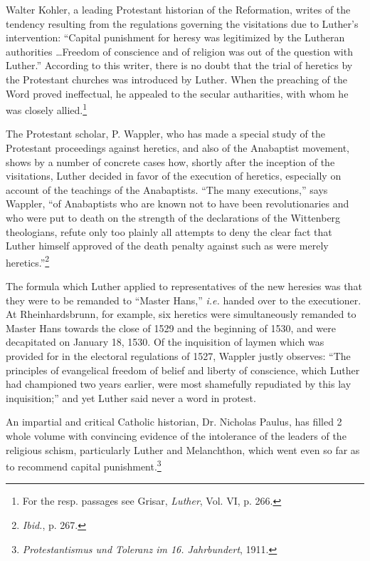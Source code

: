 Walter Kohler, a leading Protestant historian of the Reformation, writes of
the tendency resulting from the regulations governing the visitations due to
Luther’s intervention: “Capital punishment for heresy was legitimized by
the Lutheran authorities \dots Freedom of conscience and of religion was
out of the question with Luther.” According to this writer, there is no doubt
that the trial of heretics by the Protestant churches was introduced by
Luther. When the preaching of the Word proved ineffectual, he appealed
to the secular autharities, with whom he was closely allied.\footnote
{For the resp. passages see Grisar, \textit{Luther}, Vol. VI, p. 266.}

The Protestant scholar, P. Wappler, who has made a special study
of the Protestant proceedings against heretics, and also of the Anabaptist
movement, shows by a number of concrete cases how, shortly after
the inception of the visitations, Luther decided in favor of the execution of
heretics, especially on account of the teachings of the Anabaptists. “The many
executions,” says Wappler, “of Anabaptists who are known not to have
been revolutionaries and who were put to death on the strength of the
declarations of the Wittenberg theologians, refute only too plainly all
attempts to deny the clear fact that Luther himself approved of the death
penalty against such as were merely heretics.”\footnote{\textit{Ibid.}, p. 267.}

The formula which Luther applied to representatives of the new
heresies was that they were to be remanded to “Master Hans,” \textit{i.e.}
handed over to the executioner. At Rheinhardsbrunn, for example,
six heretics were simultaneously remanded to Master Hans towards
the close of 1529 and the beginning of 1530, and were decapitated on
January 18, 1530. Of the inquisition of laymen which was provided
for in the electoral regulations of 1527, Wappler justly observes:
“The principles of evangelical freedom of belief and liberty of conscience,
which Luther had championed two years earlier, were most
shamefully repudiated by this lay inquisition;” and yet Luther said
never a word in protest.

An impartial and critical Catholic historian, Dr. Nicholas Paulus,
has filled 2 whole volume with convincing evidence of the intolerance
of the leaders of the religious schism, particularly Luther and Melanchthon,
which went even so far as to recommend capital punishment.\footnote{\textit{Protestantismus und Toleranz im 16. Jahrbundert}, 1911.}

